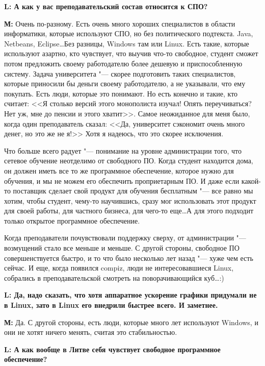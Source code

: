 \documentclass[10pt, a5paper]{article}
\begin{document}
{\noindent \bf L: А как у вас преподавательский состав относится к СПО?}

{\noindent \bf М:} Очень по-разному. Есть очень много хороших специалистов в области информатики, которые используют СПО, но без политического подтекста. Java, Netbeans, Eclipse\ldots Без разницы, Windows там или Linux. Есть такие, которые используют азартно, кто чувствует, что выучив что-то свободное, студент сможет потом предложить своему работодателю более дешевую и приспособленную систему. Задача университета "--- скорее подготовить таких специалистов, которые приносили бы деньги своему работодателю, а не указывали, что ему покупать. Есть люди, которые это понимают. Но есть конечно и такие, кто считает: <<Я столько версий этого монополиста изучал! Опять переучиваться? Нет уж, мне до пенсии и этого хватит>>. Самое неожиданное для меня было, когда один преподаватель сказал: <<Да, университет сэкономит очень много денег, но это же не я!>> Хотя я надеюсь, что это скорее исключения. 

Что больше всего радует "--- понимание на уровне администрации того, что сетевое обучение неотделимо от свободного ПО. Когда студент находится дома, он должен иметь все то же программное обеспечение, которое нужно для обучения, и мы не можем его обеспечить проприетарным ПО. И даже если какой-то поставщик сделает свой продукт для обучения бесплатным "--- все равно мы хотим, чтобы студент, чему-то научившись, сразу мог использовать этот продукт для своей работы, для частного бизнеса, для чего-то еще\ldots А для этого подходит только открытое программное обеспечение. 

Когда преподаватели почувствовали поддержку сверху, от администрации "--- возмущений стало все меньше и меньше. С другой стороны, свободное ПО совершенствуется быстро, и то что было несколько лет назад "--- хуже чем есть сейчас. И еще, когда появился compiz, люди не интересовавшиеся Linux, собрались в преподавательской смотреть на поворачивающийся куб\ldots :) 


{\noindent \bf L: Да, надо сказать, что хотя аппаратное ускорение графики придумали не в Linux, зато в Linux его внедрили быстрее всего. И заметнее. }

{\noindent \bf М:} Да. С другой стороны, есть люди, которые много лет используют Windows, и они не хотят ничего менять, считая это стабильностью. 

{\noindent \bf L: А как вообще в Литве себя чувствует свободное программное обеспечение?}
\end{document}
